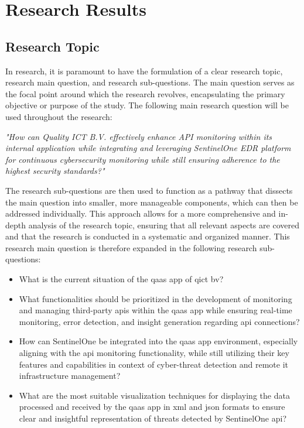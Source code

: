 \chapter{Research Results}
\begin{multicols}{2}
      \section{Research Topic}
      In research, it is paramount to have the formulation of a clear research topic, research main question,
      and research sub-questions. The main question serves as the focal point around which the research revolves,
      encapsulating the primary objective or purpose of the study.
      The following main research question will be used throughout the research:
      \begin{center}
            \textit{"How can Quality ICT B.V. effectively enhance API monitoring within its internal application
                  while integrating and leveraging SentinelOne EDR platform for continuous
                  cybersecurity monitoring while still ensuring adherence to the highest security standards?"}
      \end{center}
      The research sub-questions are then used to function as a pathway that dissects the main
      question into smaller, more manageable components, which can then be addressed individually. This approach
      allows for a more comprehensive and in-depth analysis of the research topic, ensuring that all relevant
      aspects are covered and that the research is conducted in a systematic and organized manner.
      This research main question is therefore expanded in the following research sub-questions: %
      \begin{itemize}
            \item What is the current situation of the \acrshort{qaas} app of \acrlong{qict} \acrshort{bv}?
            \item What functionalities should be prioritized in the development of monitoring and managing
                  third-party \acrshort{api}s within the \acrshort{qaas} app while ensuring real-time monitoring,
                  error detection, and insight generation regarding \acrshort{api} connections?
            \item How can SentinelOne be integrated into the \acrshort{qaas} app environment, especially
                  aligning with the \acrshort{api} monitoring functionality, while still utilizing their key
                  features and capabilities in context of cyber-threat detection and remote \acrshort{it}
                  infrastructure management?
            \item What are the most suitable visualization techniques for displaying the data processed and
                  received by the \acrshort{qaas} app in \acrshort{xml} and \acrshort{json} formats to ensure
                  clear and insightful representation of threats detected by SentinelOne \acrshort{api}?
      \end{itemize}

\end{multicols}
